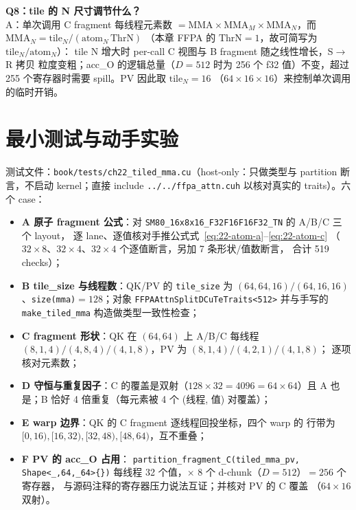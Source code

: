 \textbf{Q8：tile 的 N 尺寸调节什么？}\\
A：单次调用 C fragment 每线程元素数 $=\mathrm{MMA}\times\mathrm{MMA}_M\times
\mathrm{MMA}_N$，而 $\mathrm{MMA}_N = \mathrm{tile}_N/(\mathrm{atom}_N\,\mathrm{ThrN})$
（本章 FFPA 的 $\mathrm{ThrN}=1$，故可简写为 $\mathrm{tile}_N/\mathrm{atom}_N$）：
tile N 增大时 per-call C 视图与 B fragment 随之线性增长，S$\to$R 拷贝
粒度变粗；acc\_O 的逻辑总量（$D=512$ 时为 256 个 f32 值）不变，超过
255 个寄存器时需要 spill。PV 因此取 $\mathrm{tile}_N=16$
（$64\times16\times16$）来控制单次调用的临时开销。

\section{最小测试与动手实验}

测试文件：\texttt{book/\allowbreak{}tests/\allowbreak{}ch22\_\allowbreak{}tiled\_\allowbreak{}mma.cu}（host-only：只做类型与
partition 断言，不启动 kernel；直接 include
\texttt{.\allowbreak{}.\allowbreak{}/\allowbreak{}.\allowbreak{}.\allowbreak{}/\allowbreak{}ffpa\_\allowbreak{}attn.\allowbreak{}cuh} 以核对真实的 traits）。六个 case：

\begin{itemize}
  \item \textbf{A 原子 fragment 公式}：对
        \texttt{SM80\_\allowbreak{}16x8x16\_\allowbreak{}F32\allowbreak{}F16\allowbreak{}F16\allowbreak{}F32\_\allowbreak{}TN} 的 A/B/C 三个 layout，
        逐 lane、逐值核对手推公式式~\eqref{eq:22-atom-a}--\eqref{eq:22-atom-c}
        （$32\times8$、$32\times4$、$32\times4$ 个逐值断言，另加 7 条形状/值数断言，
        合计 519 checks）；
  \item \textbf{B tile\_size 与线程数}：QK/PV 的 \texttt{tile\_size} 为
        $(64,64,16)/(64,16,16)$、\texttt{size(mma)}$=128$；对象
        \texttt{FFPAAttn\allowbreak{}Split\allowbreak{}DCu\allowbreak{}Te\allowbreak{}Traits\allowbreak{}<512>}
        并与手写的
        \texttt{make\_\allowbreak{}tiled\_\allowbreak{}mma} 构造做类型一致性检查；
  \item \textbf{C fragment 形状}：QK 在 $(64,64)$ 上 A/B/C 每线程
        $(8,1,4)/(4,8,4)/(4,1,8)$，PV 为 $(8,1,4)/(4,2,1)/(4,1,8)$；
        逐项核对元素数；
  \item \textbf{D 守恒与重复因子}：C 的覆盖是双射（$128\times32=4096=
        64\times64$）且 A 也是；B 恰好 4 倍重复（每元素被 4 个
        (线程, 值) 对覆盖）；
  \item \textbf{E warp 边界}：QK 的 C fragment 逐线程回投坐标，四个 warp 的
        行带为 $[0,16),[16,32),[32,48),[48,64)$，互不重叠；
  \item \textbf{F PV 的 acc\_O 占用}：
        \texttt{partition\_\allowbreak{}fragment\_\allowbreak{}C\allowbreak{}(tiled\_\allowbreak{}mma\_\allowbreak{}pv,\allowbreak{} Shape\allowbreak{}<\_\allowbreak{},\allowbreak{}64,\allowbreak{}\_\allowbreak{}64>\{\})}
        每线程 32 个值，$\times$ 8 个 d-chunk（$D=512$）$=256$ 个寄存器，
        与源码注释的寄存器压力说法互证；并核对 PV 的 C 覆盖
        （$64\times16$ 双射）。
\end{itemize}

